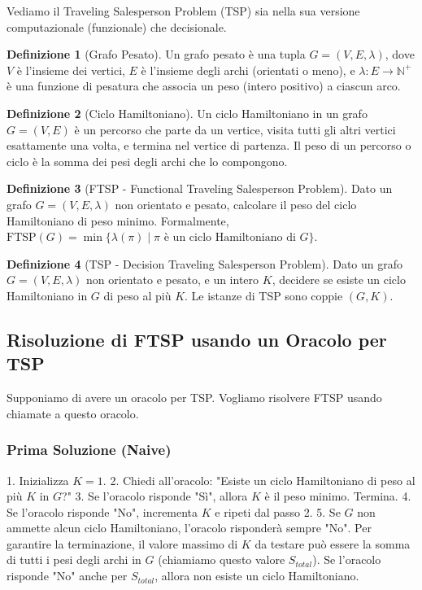 \documentclass[a4paper]{article}
\theoremstyle{definition} %
\newtheorem{definition}{Definizione}
\begin{document}
Vediamo il Traveling Salesperson Problem (TSP) sia nella sua versione computazionale (funzionale) che decisionale.

\begin{definition}[Grafo Pesato]
Un grafo pesato è una tupla $G = (V, E, \lambda)$, dove $V$ è l'insieme dei vertici, $E$ è l'insieme degli archi (orientati o meno), e $\lambda: E \to \mathbb{N}^+$ è una funzione di pesatura che associa un peso (intero positivo) a ciascun arco.
\end{definition}

\begin{definition}[Ciclo Hamiltoniano]
Un ciclo Hamiltoniano in un grafo $G=(V, E)$ è un percorso che parte da un vertice, visita tutti gli altri vertici esattamente una volta, e termina nel vertice di partenza. Il peso di un percorso o ciclo è la somma dei pesi degli archi che lo compongono.
\end{definition}

\begin{definition}[FTSP - Functional Traveling Salesperson Problem]
Dato un grafo $G=(V, E, \lambda)$ non orientato e pesato, calcolare il peso del ciclo Hamiltoniano di peso minimo.
Formalmente, $\text{FTSP}(G) = \min \{ \lambda(\pi) \mid \pi \text{ è un ciclo Hamiltoniano di } G \}$.
\end{definition}

\begin{definition}[TSP - Decision Traveling Salesperson Problem]
Dato un grafo $G=(V, E, \lambda)$ non orientato e pesato, e un intero $K$, decidere se esiste un ciclo Hamiltoniano in $G$ di peso al più $K$.
Le istanze di TSP sono coppie $(G, K)$.
\end{definition}

\subsection{Risoluzione di FTSP usando un Oracolo per TSP}

Supponiamo di avere un oracolo per TSP. Vogliamo risolvere FTSP usando chiamate a questo oracolo.

\subsubsection{Prima Soluzione (Naive)}
1.  Inizializza $K=1$.
2.  Chiedi all'oracolo: "Esiste un ciclo Hamiltoniano di peso al più $K$ in $G$?"
3.  Se l'oracolo risponde "Sì", allora $K$ è il peso minimo. Termina.
4.  Se l'oracolo risponde "No", incrementa $K$ e ripeti dal passo 2.
5.  Se $G$ non ammette alcun ciclo Hamiltoniano, l'oracolo risponderà sempre "No". Per garantire la terminazione, il valore massimo di $K$ da testare può essere la somma di tutti i pesi degli archi in $G$ (chiamiamo questo valore $S_{total}$). Se l'oracolo risponde "No" anche per $S_{total}$, allora non esiste un ciclo Hamiltoniano.
\end{document}
